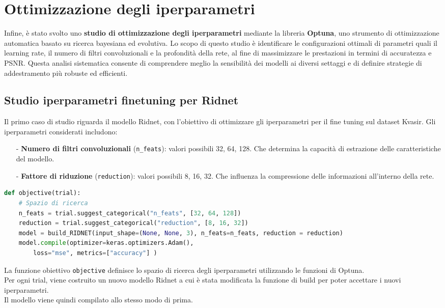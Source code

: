 \documentclass[12pt,a4paper,openright,twoside]{book}
\begin{document}
\section{Ottimizzazione degli iperparametri}
Infine, è stato svolto uno \textbf{studio di ottimizzazione degli iperparametri} mediante la libreria \textbf{Optuna}, uno strumento di ottimizzazione automatica basato su ricerca bayesiana ed evolutiva.  
Lo scopo di questo studio è identificare le configurazioni ottimali di parametri quali il learning rate, il numero di filtri convoluzionali e la profondità della rete, al fine di massimizzare le prestazioni in termini di accuratezza e PSNR.  
Questa analisi sistematica consente di comprendere meglio la sensibilità dei modelli ai diversi settaggi e di definire strategie di addestramento più robuste ed efficienti.  

\subsection*{Studio iperparametri finetuning per Ridnet}
Il primo caso di studio riguarda il modello Ridnet, con l'obiettivo di ottimizzare gli iperparametri per il fine tuning sul dataset Kvasir.
Gli iperparametri considerati includono:
\begin{itemize}
    \item[-] \textbf{Numero di filtri convoluzionali} (\texttt{n\_feats}): valori possibili 32, 64, 128. Che determina la capacità di estrazione delle caratteristiche del modello.
    \item[-] \textbf{Fattore di riduzione} (\texttt{reduction}): valori possibili 8, 16, 32. Che influenza la compressione delle informazioni all'interno della rete.
\end{itemize}
\begin{lstlisting}[language=Python, caption={Definizione della funzione obiettivo}, label={lst:optuna_obj}]
def objective(trial):
    # Spazio di ricerca
    n_feats = trial.suggest_categorical("n_feats", [32, 64, 128])
    reduction = trial.suggest_categorical("reduction", [8, 16, 32])
    model = build_RIDNET(input_shape=(None, None, 3), n_feats=n_feats, reduction = reduction)
    model.compile(optimizer=keras.optimizers.Adam(),
        loss="mse", metrics=["accuracy"] )
\end{lstlisting}
La funzione obiettivo \texttt{objective} definisce lo spazio di ricerca degli iperparametri utilizzando le funzioni di Optuna.\\
Per ogni trial, viene costruito un nuovo modello Ridnet a cui è stata modificata la funzione di build per poter accettare i nuovi iperparametri.\\
Il modello viene quindi compilato allo stesso modo di prima.
\end{document}
